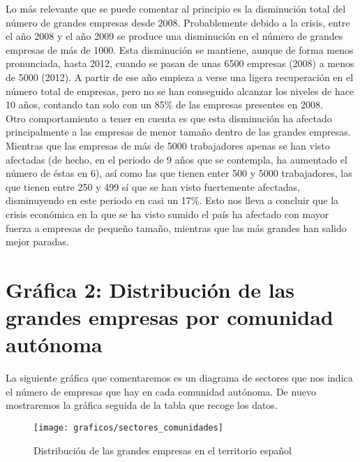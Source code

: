 \documentclass[11pt]{article}
\theoremstyle{plain}
\theoremstyle{definition}
\begin{document}
Lo más relevante que se puede comentar al principio es la disminución
total del número de grandes empresas desde 2008. Probablemente debido
a la crisis, entre el año 2008 y el año 2009 se produce una
disminución en el número de grandes empresas de más de 1000. Esta
disminución se mantiene, aunque de forma menos pronunciada, hasta
2012, cuando se pasan de unas 6500 empresas (2008) a menos de 5000
(2012). A partir de ese año empieza a verse una ligera recuperación en
el número total de empresas, pero
no se han conseguido alcanzar los niveles de hace 10 años, contando tan 
solo con un 85\% de las empresas presentes en 2008.\\

Otro comportamiento a tener en cuenta es que esta disminución ha
afectado principalmente a las empresas de menor tamaño dentro de las
grandes empresas. Mientras que las empresas de más de 5000
trabajadores apenas se han visto afectadas (de hecho, en el periodo de
9 años que se contempla, ha aumentado el número de éstas en 6), así
como las que tienen enter 500 y 5000 trabajadores, las que tienen
entre 250 y 499 sí que se han visto fuertemente afectadas, disminuyendo
en este periodo en casi un 17\%. Esto nos
lleva a concluir que la crisis económica en la que se ha visto sumido
el país ha afectado con mayor fuerza a empresas de pequeño tamaño,
mientras que las más grandes han salido mejor paradas.

\section{Gráfica 2: Distribución de las grandes empresas por comunidad
  autónoma}

La siguiente gráfica que comentaremos es un diagrama de sectores que
nos indica el número de empresas que hay en cada comunidad autónoma.
De nuevo mostraremos la gráfica seguida de la tabla que recoge los
datos.

\begin{figure}[H]
  \centering
  \texttt{[image: graficos/sectores\_comunidades]}
  \caption{Distribución de las grandes empresas en el territorio
    español}
\end{figure}
\end{document}
